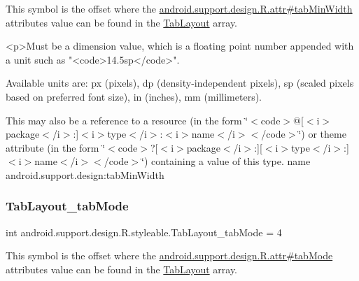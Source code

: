 This symbol is the offset where the \hyperlink{classandroid_1_1support_1_1design_1_1R_1_1attr_aeebab001b7ec8560a919d37c4732c6e9}{android.\+support.\+design.\+R.\+attr\#tab\+Min\+Width} attribute\textquotesingle{}s value can be found in the \hyperlink{classandroid_1_1support_1_1design_1_1R_1_1styleable_a514b47b47f600f9421b65f4f0aa832d6}{Tab\+Layout} array.

\begin{DoxyVerb}      <p>Must be a dimension value, which is a floating point number appended with a unit such as "<code>14.5sp</code>".
\end{DoxyVerb}
 Available units are\+: px (pixels), dp (density-\/independent pixels), sp (scaled pixels based on preferred font size), in (inches), mm (millimeters). 

This may also be a reference to a resource (in the form \char`\"{}$<$code$>$@\mbox{[}$<$i$>$package$<$/i$>$\+:\mbox{]}$<$i$>$type$<$/i$>$\+:$<$i$>$name$<$/i$>$$<$/code$>$\char`\"{}) or theme attribute (in the form \char`\"{}$<$code$>$?\mbox{[}$<$i$>$package$<$/i$>$\+:\mbox{]}\mbox{[}$<$i$>$type$<$/i$>$\+:\mbox{]}$<$i$>$name$<$/i$>$$<$/code$>$\char`\"{}) containing a value of this type.  name android.\+support.\+design\+:tab\+Min\+Width \mbox{\label{classandroid_1_1support_1_1design_1_1R_1_1styleable_a1792137b082bddced52c3c6742bc02f7}} 
\subsubsection{\texorpdfstring{Tab\+Layout\+\_\+tab\+Mode}{TabLayout\_tabMode}}
{\footnotesize\ttfamily int android.\+support.\+design.\+R.\+styleable.\+Tab\+Layout\+\_\+tab\+Mode = 4\hspace{0.3cm}{\ttfamily [static]}}

This symbol is the offset where the \hyperlink{classandroid_1_1support_1_1design_1_1R_1_1attr_aa7fc1fe2e9256dc49e7439e5799302d3}{android.\+support.\+design.\+R.\+attr\#tab\+Mode} attribute\textquotesingle{}s value can be found in the \hyperlink{classandroid_1_1support_1_1design_1_1R_1_1styleable_a514b47b47f600f9421b65f4f0aa832d6}{Tab\+Layout} array.

